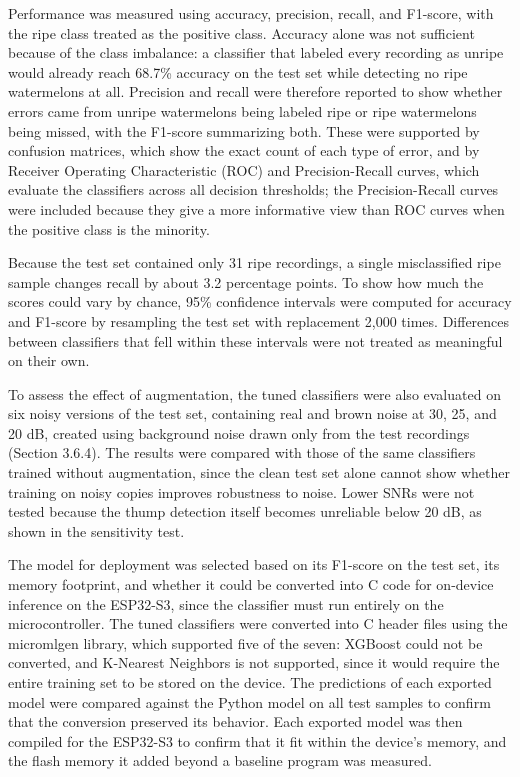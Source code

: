 \begin{thesisprose}
Performance was measured using accuracy, precision, recall, and F1-score, with the ripe class treated as the positive class. Accuracy alone was not sufficient because of the class imbalance: a classifier that labeled every recording as unripe would already reach 68.7\% accuracy on the test set while detecting no ripe watermelons at all. Precision and recall were therefore reported to show whether errors came from unripe watermelons being labeled ripe or ripe watermelons being missed, with the F1-score summarizing both. These were supported by confusion matrices, which show the exact count of each type of error, and by Receiver Operating Characteristic (ROC) and Precision-Recall curves, which evaluate the classifiers across all decision thresholds; the Precision-Recall curves were included because they give a more informative view than ROC curves when the positive class is the minority.

Because the test set contained only 31 ripe recordings, a single misclassified ripe sample changes recall by about 3.2 percentage points. To show how much the scores could vary by chance, 95\% confidence intervals were computed for accuracy and F1-score by resampling the test set with replacement 2,000 times. Differences between classifiers that fell within these intervals were not treated as meaningful on their own.

To assess the effect of augmentation, the tuned classifiers were also evaluated on six noisy versions of the test set, containing real and brown noise at 30, 25, and 20 dB, created using background noise drawn only from the test recordings (Section 3.6.4). The results were compared with those of the same classifiers trained without augmentation, since the clean test set alone cannot show whether training on noisy copies improves robustness to noise. Lower SNRs were not tested because the thump detection itself becomes unreliable below 20 dB, as shown in the sensitivity test.

The model for deployment was selected based on its F1-score on the test set, its memory footprint, and whether it could be converted into C code for on-device inference on the ESP32-S3, since the classifier must run entirely on the microcontroller. The tuned classifiers were converted into C header files using the micromlgen library, which supported five of the seven: XGBoost could not be converted, and K-Nearest Neighbors is not supported, since it would require the entire training set to be stored on the device. The predictions of each exported model were compared against the Python model on all test samples to confirm that the conversion preserved its behavior. Each exported model was then compiled for the ESP32-S3 to confirm that it fit within the device’s memory, and the flash memory it added beyond a baseline program was measured.


\end{thesisprose}
